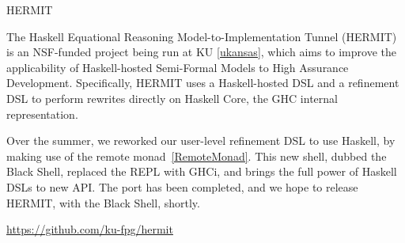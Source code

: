 \begin{hcarentry}[updated]{HERMIT}
\label{HERMIT}
\makeheader

The Haskell Equational Reasoning Model-to-Implementation Tunnel (HERMIT) is an
NSF-funded project being run at KU \cref{ukansas}, which aims to improve the
applicability of Haskell-hosted Semi-Formal Models to High Assurance
Development.  Specifically, HERMIT uses a Haskell-hosted DSL and a refinement
DSL to perform rewrites directly on Haskell Core, the GHC internal
representation.

Over the summer, we reworked our user-level refinement DSL to use Haskell, by
making use of the remote monad~\cref{RemoteMonad}. This new shell, dubbed the
Black Shell, replaced the REPL with GHCi, and brings the full power of Haskell
DSLs to new API. The port has been completed, and we hope to release HERMIT,
with the Black Shell, shortly.

\FurtherReading
  \url{https://github.com/ku-fpg/hermit}
\end{hcarentry}
